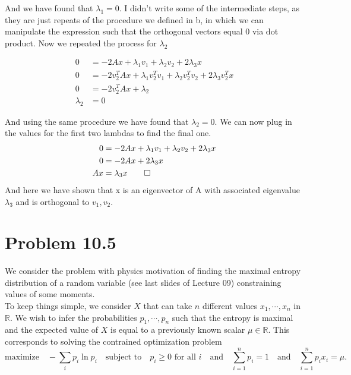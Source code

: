 \documentclass[12pt,twoside]{article}
\newcommand{\R}{\mathbb{R}}
\begin{document}
And we have found that $\lambda_1 = 0$. I didn't write some of the intermediate steps, as they are just repeats of the procedure we defined in b, in which we can manipulate the expression such that the orthogonal vectors equal 0 via dot product. Now we repeated the process for $\lambda_2$

\begin{equation}
    \begin{split}
        0 &= -2Ax + \lambda_1 v_1 + \lambda_2 v_2 + 2\lambda_3x  \\
        0 &= -2v_2^TAx + \lambda_1 v_2^Tv_1 + \lambda_2 v_2^Tv_2 + 2\lambda_3 v_2^Tx \\
        0 &= -2v_2^TAx + \lambda_2 \\
        \lambda_2 &= 0
    \end{split}
\end{equation}

And using the same procedure we have found that $\lambda_2 = 0$. We can now plug in the values for the first two lambdas to find the final one.
\begin{equation}
    \begin{split}
        0 &= -2Ax + \lambda_1 v_1 + \lambda_2 v_2 + 2\lambda_3x  \\
        0 &= -2Ax + 2\lambda_3x \\ 
        Ax &= \lambda_3x \qed
    \end{split}
\end{equation}
And here we have shown that x is an eigenvector of A with associated eigenvalue $\lambda_3$ and is orthogonal to $v_1,v_2$.

\newpage 

\section{Problem 10.5}
	We consider the problem with physics motivation of finding the maximal entropy distribution of a random variable (see last slides of Lecture 09)  constraining values of some moments. \\
	

	To keep things simple, we consider $X$ that can take $n$ different values $x_1, \cdots, x_n$ in $\R$. We wish to infer the probabilities $p_1, \cdots, p_n$ such that the entropy is maximal and the expected value of $X$ is equal to a previously known scalar $\mu \in \R$. This corresponds to solving the contrained optimization problem
	\begin{equation}\label{eq:eig3}
		\text{maximize} \quad - \sum_i p_i \ln p_i \quad \text{subject to} \quad p_i \geq 0 \text{ for all } i
		\quad \text{and} \quad \sum_{i=1}^n p_i = 1
		\quad \text{and} \quad \sum_{i=1}^n p_i x_i = \mu.
	\end{equation}
\end{document}
